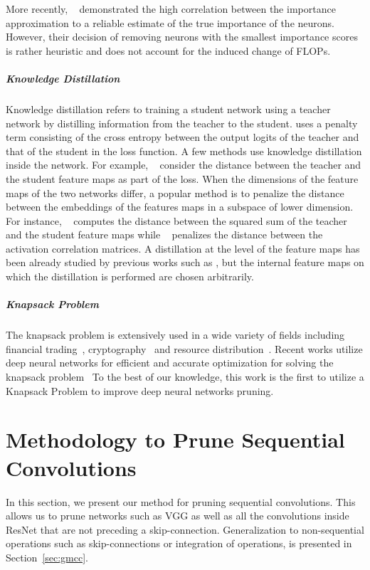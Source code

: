 \documentclass{article}
\begin{document}
More recently, ~\cite{molchanov2019taylor} demonstrated the high correlation between the importance approximation to a reliable estimate of the true importance of the neurons. However, their decision of removing  neurons with the smallest importance scores is rather heuristic and does not account for the induced change of FLOPs.
\subparagraph{Knowledge Distillation}
Knowledge distillation refers to training a student network using a teacher network by distilling information from the teacher to the student. \cite{KnowledgeDistillation} uses a penalty term consisting of the cross entropy between the output logits of the teacher and that of the student in the loss function.
A few methods use knowledge distillation inside the network. For example, ~\cite{li2019blockwisely, progressiveblock} consider the  distance between the teacher and the student feature maps as part of the loss.
When the dimensions of the feature maps of the two networks differ, a popular method is to penalize the distance between the embeddings of the features maps in a subspace of lower dimension. For instance, ~\cite{moonshine} computes the  distance between the squared sum of the teacher and the student feature maps while ~\cite{Tung2019SimilarityPreservingKD} penalizes the distance between the activation correlation matrices. A distillation at the level of the feature maps has been already studied by previous works such as \cite{fitnets, Heo_2019_ICCV}, but the internal feature maps on which the distillation is performed are chosen arbitrarily.
\subparagraph{Knapsack Problem} The knapsack problem is extensively used in a wide variety of fields including financial trading~\cite{markowitz1957solution}, cryptography~\cite{odlyzko1990rise} and resource distribution~\cite{vanderster2009resource}. Recent works utilize deep neural networks for efficient and accurate optimization for solving the knapsack problem~\cite{gu2018pointer, martini2019application} To the best of our knowledge, this work is the first to utilize a Knapsack Problem to improve deep neural networks pruning.

\section{Methodology to Prune Sequential Convolutions}
\label{sec:methodology_seq}



\vspace{-5pt} 
In this section, we present our method for pruning sequential convolutions. This allows us to prune networks such as VGG as well as all the convolutions inside ResNet that are not preceding a skip-connection. 
 Generalization to non-sequential operations such as skip-connections or integration of operations, is presented in Section~\ref{sec:gmcc}.
\end{document}
